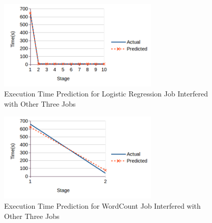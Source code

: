 \begin{figure}[!t]
\centering
\captionsetup{justification=centering}
\includegraphics[width=3in]{figures/lr20g_pr_km_wc.png}
\caption{Execution Time Prediction for Logistic Regression Job Interfered with Other Three Jobs}
\label{lr20gprkmwc}
\end{figure}
\begin{figure}[!t]
\centering
\captionsetup{justification=centering}
\includegraphics[width=3in]{figures/wc20g_pr_km_lr.png}
\caption{Execution Time Prediction for WordCount Job Interfered with Other Three Jobs}
\label{wc20gprkmlr}
\end{figure}

